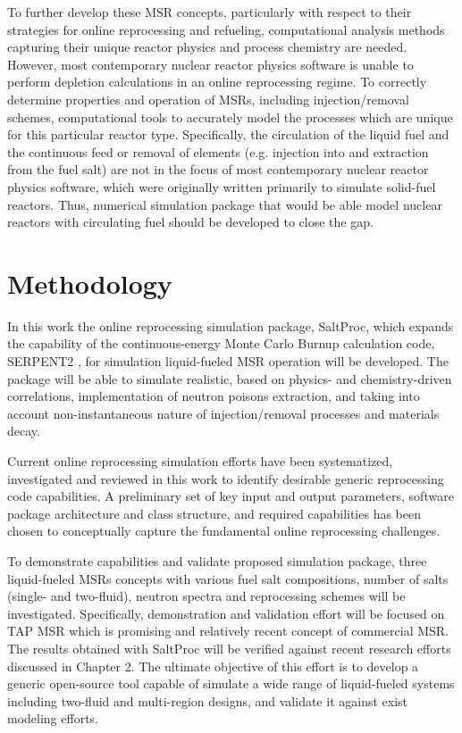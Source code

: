 To further develop these \gls{MSR} concepts, particularly with respect to their  
strategies for online reprocessing and refueling, computational analysis methods capturing their unique reactor physics and process chemistry are needed.
However, most contemporary nuclear reactor physics software is unable to 
perform depletion calculations in an online reprocessing regime. To correctly 
determine properties and operation of \glspl{MSR}, including injection/removal 
schemes, computational tools to accurately model the processes which are unique 
for this particular reactor type. Specifically, the circulation of the
liquid fuel and the continuous feed or removal of elements (e.g. injection into 
and extraction from the fuel salt) are not in the focus of most contemporary 
nuclear reactor physics software, which were originally written primarily to 
simulate solid-fuel reactors. Thus, numerical simulation package that would be 
able model nuclear reactors with circulating fuel should be developed to close 
the gap.

\section{Methodology}
In this work the online reprocessing simulation package, SaltProc, which expands the capability 
of the continuous-energy Monte Carlo Burnup calculation code, SERPENT2 
\cite{leppanen_serpent_2015}, for simulation liquid-fueled \gls{MSR} operation 
will be developed. The package will 
be able to simulate realistic, based on physics- and chemistry-driven correlations, 
implementation of neutron poisons extraction, and 
taking into account non-instantaneous nature of injection/removal processes 
and materials decay. 

Current online reprocessing simulation efforts have been systematized, investigated and reviewed in this work to identify desirable generic reprocessing code capabilities. 
A preliminary set of key input and output parameters, software package architecture and 
class structure, and required capabilities has been chosen 
to conceptually capture the fundamental online reprocessing challenges. 

To demonstrate capabilities and validate proposed simulation package, three 
liquid-fueled \glspl{MSR} concepts with various fuel salt compositions, 
number of salts (single- and two-fluid), neutron spectra and 
reprocessing schemes will be investigated. Specifically, demonstration 
and validation effort will be focused on \gls{TAP} \gls{MSR} 
which is promising and relatively recent concept of commercial \gls{MSR}. 
The results obtained with SaltProc will be verified against recent research 
efforts discussed in Chapter 2. The ultimate objective of this effort is to 
develop a generic open-source tool capable of 
simulate a wide range of liquid-fueled systems including two-fluid and multi-region 
designs, and validate it against exist modeling efforts.